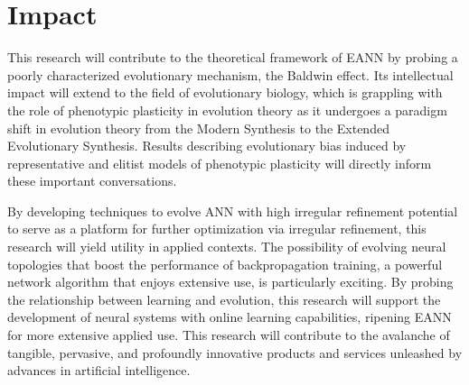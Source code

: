 \section{Impact}

This research will contribute to the theoretical framework of EANN by probing a poorly characterized evolutionary mechanism, the Baldwin effect. Its intellectual impact will extend to the field of evolutionary biology, which is grappling with the role of phenotypic plasticity in evolution theory as it undergoes a paradigm shift in evolution theory from the Modern Synthesis to the Extended Evolutionary Synthesis.\autocite{Pigliucci2008IsEvolvable} Results describing evolutionary bias induced by representative and elitist models of phenotypic plasticity will directly inform these important conversations.

By developing techniques to evolve ANN with high irregular refinement potential to serve as a platform for further optimization via irregular refinement, this research will yield utility in applied contexts. The possibility of evolving neural topologies that boost the performance of backpropagation training, a powerful network algorithm that enjoys extensive use, is particularly exciting. By probing the relationship between learning and evolution, this research will support the development of neural systems with online learning capabilities, ripening EANN for more extensive applied use. This research will contribute to the avalanche of tangible, pervasive, and profoundly innovative products and services unleashed by advances in artificial intelligence.